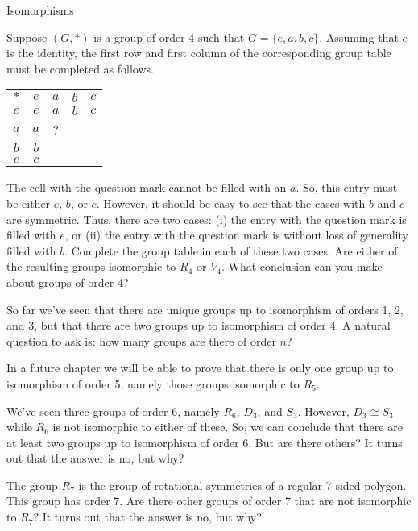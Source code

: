 \begin{section}{Isomorphisms}
\begin{problem}
Suppose $(G,*)$ is a group of order 4 such that $G=\{e,a,b,c\}$.  Assuming that $e$ is the identity, the first row and first column of the corresponding group table must be completed as follows.

\begin{center}
\begin{tabular}{c!{\vrule width 2pt}c|c|c|c}
$*$ & $e$ & $a$ & $b$ & $c$ \\ 
$e$ &  $e$ & $a$ & $b$ & $c$ \\
\hline $a$ & $a$ & ? & & \\
\hline $b$ & $b$ & & & \\
\hline $c$ & $c$ & & &
\end{tabular}
\end{center}

\noindent The cell with the question mark cannot be filled with an $a$.  So, this entry must be either $e$, $b$, or $c$.  However, it should be easy to see that the cases with $b$ and $c$ are symmetric.  Thus, there are two cases: (i) the entry with the question mark is filled with $e$, or (ii) the entry with the question mark is without loss of generality filled with $b$.  Complete the group table in each of these two cases.  Are either of the resulting groups isomorphic to $R_4$ or $V_4$.  What conclusion can you make about groups of order 4?
\end{problem}

So far we've seen that there are unique groups up to isomorphism of orders 1, 2, and 3, but that there are two groups up to isomorphism of order 4.  A natural question to ask is: how many groups are there of order $n$?

In a future chapter we will be able to prove that there is only one group up to isomorphism of order 5, namely those groups isomorphic to $R_5$.

We've seen three groups of order 6, namely $R_6$, $D_3$, and $S_3$.  However, $D_3\cong S_3$ while $R_6$ is not isomorphic to either of these.  So, we can conclude that there are at least two groups up to isomorphism of order 6.   But are there others?  It turns out that the answer is no, but why?

The group $R_7$ is the group of rotational symmetries of a regular 7-sided polygon.  This group has order 7.  Are there other groups of order 7 that are not isomorphic to $R_7$? It turns out that the answer is no, but why?


\end{section}
